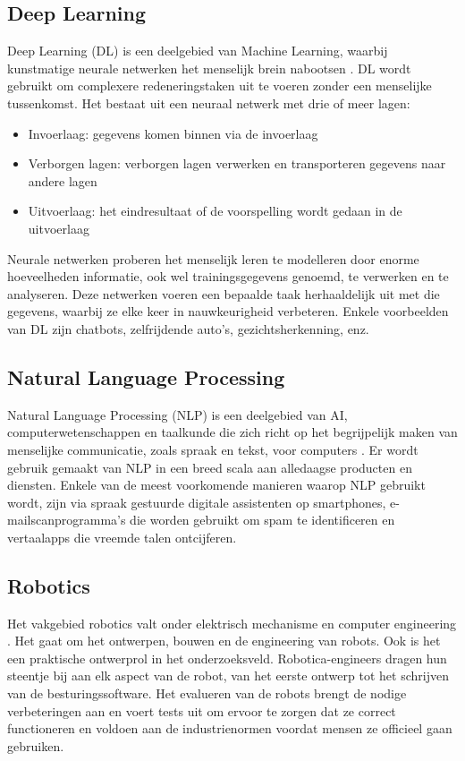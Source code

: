\subsection{Deep Learning}
Deep Learning (DL) is een deelgebied van Machine Learning, waarbij kunstmatige neurale netwerken het menselijk brein nabootsen \autocite{Coursera2024a}. DL wordt gebruikt om complexere redeneringstaken uit te voeren zonder een menselijke tussenkomst. Het bestaat uit een neuraal netwerk met drie of meer lagen: 
\begin{itemize}
  \item	Invoerlaag: gegevens komen binnen via de invoerlaag
  \item	Verborgen lagen: verborgen lagen verwerken en transporteren gegevens naar andere lagen
  \item	Uitvoerlaag: het eindresultaat of de voorspelling wordt gedaan in de uitvoerlaag
\end{itemize}
Neurale netwerken proberen het menselijk leren te modelleren door enorme hoeveelheden informatie, ook wel trainingsgegevens genoemd, te verwerken en te analyseren. Deze netwerken voeren een bepaalde taak herhaaldelijk uit met die gegevens, waarbij ze elke keer in nauwkeurigheid verbeteren. Enkele voorbeelden van DL zijn chatbots, zelfrijdende auto’s, gezichtsherkenning, enz.

\subsection{Natural Language Processing}
Natural Language Processing (NLP) is een deelgebied van AI, computerwetenschappen en taalkunde die zich richt op het begrijpelijk maken van menselijke communicatie, zoals spraak en tekst, voor computers \autocite{Coursera2024b}. Er wordt gebruik gemaakt van NLP in een breed scala aan alledaagse producten en diensten. Enkele van de meest voorkomende manieren waarop NLP gebruikt wordt, zijn via spraak gestuurde digitale assistenten op smartphones, e-mailscanprogramma's die worden gebruikt om spam te identificeren en vertaalapps die vreemde talen ontcijferen.

\subsection{Robotics}
Het vakgebied robotics valt onder elektrisch mechanisme en computer engineering \autocite{Coursera2023}. Het gaat om het ontwerpen, bouwen en de engineering van robots. Ook is het een praktische ontwerprol in het onderzoeksveld. Robotica-engineers dragen hun steentje bij aan elk aspect van de robot, van het eerste ontwerp tot het schrijven van de besturingssoftware. Het evalueren van de robots brengt de nodige verbeteringen aan en voert tests uit om ervoor te zorgen dat ze correct functioneren en voldoen aan de industrienormen voordat mensen ze officieel gaan gebruiken. 

